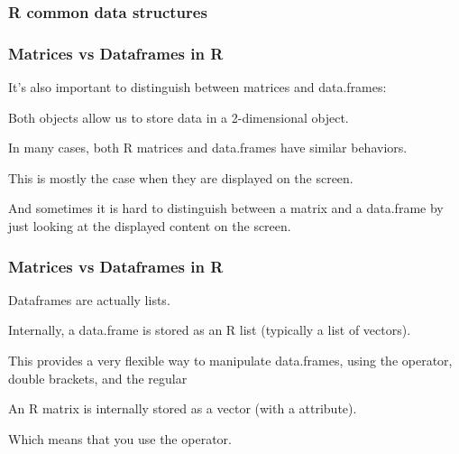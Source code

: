 \documentclass[12pt]{beamer}\usepackage[]{graphicx}\usepackage[]{color}
\begin{document}

\begin{frame}[fragile]
\frametitle{R common data structures}
\begin{center}
\end{center}
\end{frame}


\begin{frame}
\frametitle{Matrices vs Dataframes in R}

It's also important to distinguish between matrices and data.frames:
\bi
  \item Both objects allow us to store data in a 2-dimensional object.
  \item In many cases, both R matrices and data.frames have similar behaviors.
  \item This is mostly the case when they are displayed on the screen.
  \item And sometimes it is hard to distinguish between a matrix and a data.frame
  by just looking at the displayed content on the screen.
\ei

\end{frame}


\begin{frame}
\frametitle{Matrices vs Dataframes in R}

\bi
  \item Dataframes are actually lists.
  \item Internally, a data.frame is stored as an R list (typically a list of vectors).
  \item This provides a very flexible way to manipulate data.frames, using 
  the \code{\$} operator, double brackets\code{[[]]}, and the regular \code{[,]}
  \item An R matrix is internally stored as a vector (with a  attribute).
  \item Which means that you use the \code{[,]} operator.
\ei

\end{frame}

\end{document}
